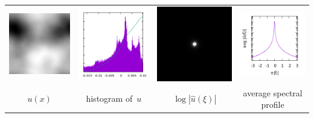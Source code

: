 \begin{tabular}{cccc}
	\includegraphics{KK-3.png} &
	\includegraphics{KK-3_h.png} &
	\includegraphics{KK-3_f.png} &
	\includegraphics{KK-3_p.png} \\
	$u(x)$ &
	histogram of~$u$ &
	$\log|\hat u(\xi)|$ &
	average spectral profile
\end{tabular}
